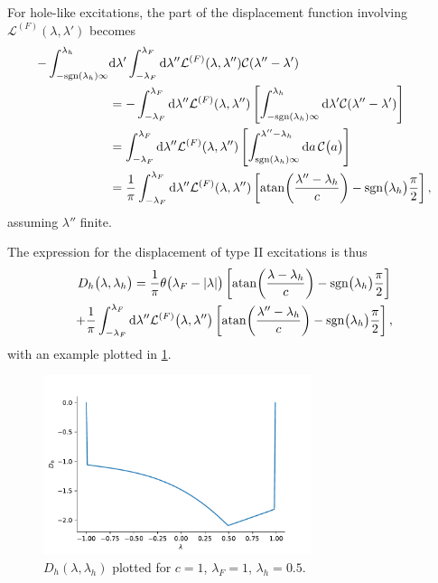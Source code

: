 \documentclass[11pt, a4paper]{report} %
\begin{document}
For hole-like excitations, the part of the displacement function involving \(\mathcal{L}^{(F)}(\lambda,\lambda')\) becomes
\begin{align}
	 - \int_{-\textrm{sgn}(\lambda_h)\infty}^{\lambda_h} &\dd \lambda' \int_{-\lambda_F}^{\lambda_F} \dd \lambda''  \mathcal{L}^{(F)}\qty(\lambda,\lambda'') \mathcal{C}\qty(\lambda''-\lambda')\\
	 &= - \int_{-\lambda_F}^{\lambda_F} \dd \lambda''  \mathcal{L}^{(F)}\qty(\lambda,\lambda'')\left[ \int_{-\textrm{sgn}(\lambda_h)\infty}^{\lambda_h} \dd \lambda' \mathcal{C}\qty(\lambda''-\lambda')\right]\\
	 &= \int_{-\lambda_F}^{\lambda_F} \dd \lambda''  \mathcal{L}^{(F)}\qty(\lambda,\lambda'')\left[ \int_{\textrm{sgn}(\lambda_h)\infty}^{\lambda''-\lambda_h} \dd a \, \mathcal{C}\qty\big(a)\right]\\
	 &= \frac{1}{\pi}\int_{-\lambda_F}^{\lambda_F} \dd  \lambda''  \mathcal{L}^{(F)}\qty(\lambda,\lambda'')\left[ \atan(\frac{\lambda''-\lambda_h}{c}) - \textrm{sgn}\qty\big(\lambda_h)\frac{\pi}{2}\right],
\end{align}
assuming \(\lambda''\) finite.

The expression for the displacement of type II excitations is thus
\begin{multline}
	D_h\qty\big(\lambda, \lambda_h) = \frac{1}{\pi}\theta\qty\big(\lambda_F - \abs{\lambda}) \left[ \atan(\frac{\lambda-\lambda_h}{c}) - \textrm{sgn}\qty\big(\lambda_h)\frac{\pi}{2}\right] \\+
	\frac{1}{\pi}\int_{-\lambda_F}^{\lambda_F} \dd  \lambda''  \mathcal{L}^{(F)}\qty\big(\lambda,\lambda'')\left[ \atan(\frac{\lambda''-\lambda_h}{c}) - \textrm{sgn}\qty\big(\lambda_h)\frac{\pi}{2}\right],
\end{multline}
with an example plotted in \cref{fig:dhplot}.
\begin{figure}[tb!]
  \centering
  \includegraphics[width=0.7\textwidth]{dhplot.pdf}
  \caption{$D_h(\lambda,\lambda_h)$ plotted for \(c=1\), \(\lambda_F=1\), \(\lambda_h=0.5\).}\label{fig:dhplot}
\end{figure}
\end{document}
